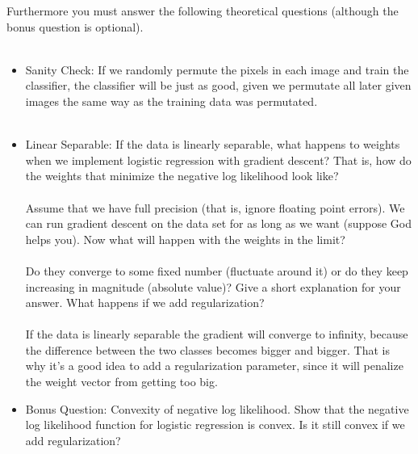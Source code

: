 \documentclass[paper=a4, fontsize=11pt]{scrartcl} %
\begin{document}
Furthermore you must answer the following theoretical questions (although the bonus question is optional). \\ \\
\begin{itemize}
\item Sanity Check: If we randomly permute the pixels in each image and train the classifier, the classifier will be just as good, given we permutate all later given images the same way as the training data was permutated. 
\\ \\
\item Linear Separable: If the data is linearly separable, what happens to weights when we implement logistic regression with gradient descent? That is, how do the weights that minimize the negative log likelihood look like? \\ \\
Assume that we have full precision (that is, ignore floating point errors). We can run gradient descent on the data set for as long as we want (suppose God helps you). Now what will happen with the weights in the limit? \\ \\
Do they converge to some fixed number (fluctuate around it) or do they keep increasing in magnitude (absolute value)? Give a short explanation for your answer. What happens if we add regularization? \\ \\

If the data is linearly separable the gradient will converge to infinity, because the difference between the two classes becomes bigger and bigger. That is why it's a good idea to add a regularization parameter, since it will penalize the weight vector from getting too big. 

\item Bonus Question: Convexity of negative log likelihood. Show that the negative log likelihood function for logistic regression is convex. Is it still convex if we add regularization?
\end{itemize}
\end{document}
